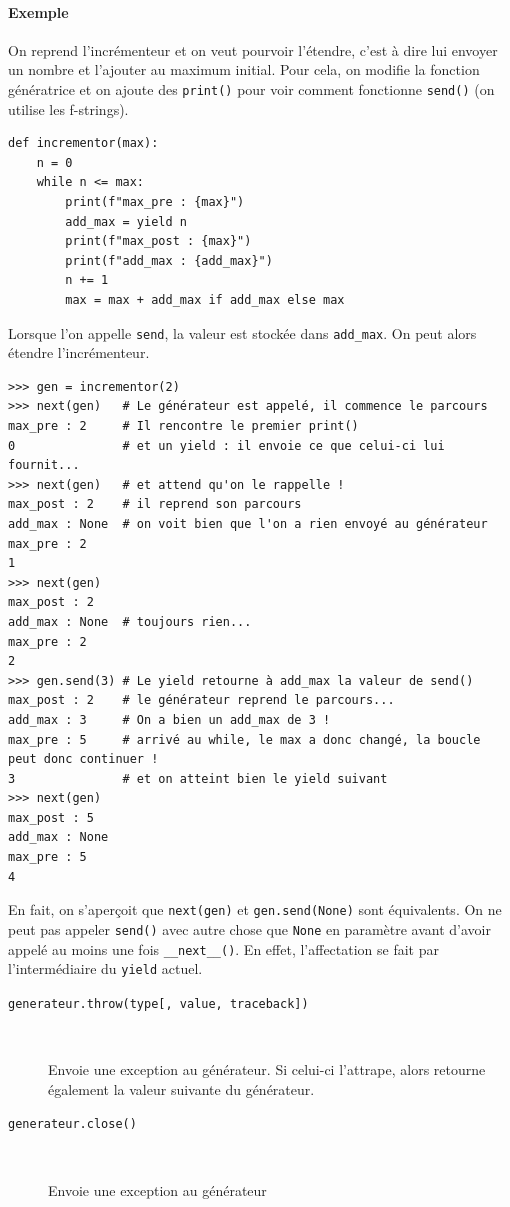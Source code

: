 \documentclass[a4paper, 10pt]{article}
\begin{document}
\paragraph{Exemple} On reprend l'incrémenteur et on veut pourvoir l'étendre, c'est à dire lui envoyer un nombre et l'ajouter au maximum initial. Pour cela, on modifie la fonction génératrice et on ajoute des \texttt{print()} pour voir comment fonctionne \texttt{send()} (on utilise les f-strings).
\begin{verbatim}
def incrementor(max):
    n = 0
    while n <= max:
        print(f"max_pre : {max}")
        add_max = yield n
        print(f"max_post : {max}")
        print(f"add_max : {add_max}")
        n += 1
        max = max + add_max if add_max else max
\end{verbatim}
Lorsque l'on appelle \texttt{send}, la valeur est stockée dans \texttt{add_max}. On peut alors étendre l'incrémenteur.
\begin{verbatim}
>>> gen = incrementor(2)
>>> next(gen)   # Le générateur est appelé, il commence le parcours
max_pre : 2     # Il rencontre le premier print()
0               # et un yield : il envoie ce que celui-ci lui fournit...
>>> next(gen)   # et attend qu'on le rappelle !
max_post : 2    # il reprend son parcours
add_max : None  # on voit bien que l'on a rien envoyé au générateur
max_pre : 2
1
>>> next(gen)
max_post : 2
add_max : None  # toujours rien...
max_pre : 2
2
>>> gen.send(3) # Le yield retourne à add_max la valeur de send()
max_post : 2    # le générateur reprend le parcours...
add_max : 3     # On a bien un add_max de 3 !
max_pre : 5     # arrivé au while, le max a donc changé, la boucle peut donc continuer !
3               # et on atteint bien le yield suivant
>>> next(gen)
max_post : 5
add_max : None
max_pre : 5
4
\end{verbatim}
En fait, on s'aperçoit que \texttt{next(gen)} et \texttt{gen.send(None)} sont équivalents. On ne peut pas appeler \texttt{send()} avec autre chose que \texttt{None} en paramètre avant d'avoir appelé au moins une fois \texttt{__next__()}. En effet, l'affectation se fait par l'intermédiaire du \texttt{yield} actuel.

\begin{description}
    \item[\texttt{generateur.throw(type[, value, traceback])}]~

    Envoie une exception au générateur. Si celui-ci l'attrape, alors retourne également la valeur suivante du générateur.

    \item[\texttt{generateur.close()}]~

    Envoie une exception au générateur
\end{description}
\end{document}
